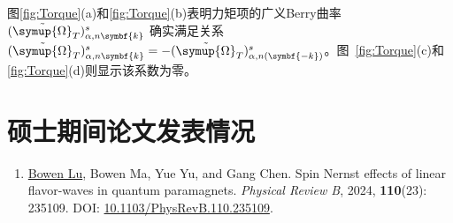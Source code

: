 \documentclass[type=master]{fduthesis}
\newcommand{\bm}[1]{\symbf{#1}}
\begin{document}
图\ref{fig:Torque}(a)和\ref{fig:Torque}(b)表明力矩项的广义Berry曲率 $(\tilde{\symup{\Omega}}_T)^s_{\alpha,n{\bm{k}}}$ 确实满足关系 $(\tilde{\symup{\Omega}}_T)^s_{\alpha,n{\bm{k}}}=-(\tilde{\symup{\Omega}}_T)^s_{\alpha,n(\bm{-k})}$。图~\ref{fig:Torque}(c)和\ref{fig:Torque}(d)则显示该系数为零。


\backmatter

\printbibliography

\chapter{硕士期间论文发表情况}
\begin{enumerate}
  \item \underline{Bowen Lu}, Bowen Ma, Yue Yu, and Gang Chen. Spin Nernst effects of linear flavor-waves in quantum  paramagnets. \emph{Physical Review B}, 2024, \textbf{110}(23): 235109. DOI: \href{https://doi.org/10.1103/PhysRevB.110.235109}{10.1103/PhysRevB.110.235109}.

\end{enumerate}
\end{document}
